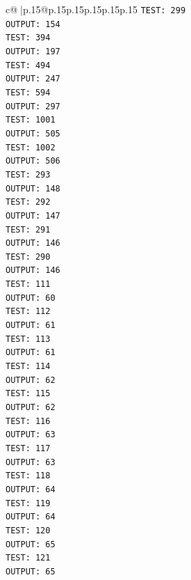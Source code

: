 \documentclass{article}
\begin{document}
{\begin{supertabular}{c@{$\;$}|p{.15\linewidth}@{}p{.15\linewidth}p{.15\linewidth}p{.15\linewidth}p{.15\linewidth}p{.15\linewidth}}
{{{\texttt{TEST: 299} \\
\texttt{OUTPUT: 154} \\
\texttt{TEST: 394} \\
\texttt{OUTPUT: 197} \\
\texttt{TEST: 494} \\
\texttt{OUTPUT: 247} \\
\texttt{TEST: 594} \\
\texttt{OUTPUT: 297} \\
\texttt{TEST: 1001} \\
\texttt{OUTPUT: 505} \\
\texttt{TEST: 1002} \\
\texttt{OUTPUT: 506} \\
\texttt{TEST: 293} \\
\texttt{OUTPUT: 148} \\
\texttt{TEST: 292} \\
\texttt{OUTPUT: 147} \\
\texttt{TEST: 291} \\
\texttt{OUTPUT: 146} \\
\texttt{TEST: 290} \\
\texttt{OUTPUT: 146} \\
\texttt{TEST: 111} \\
\texttt{OUTPUT: 60} \\
\texttt{TEST: 112} \\
\texttt{OUTPUT: 61} \\
\texttt{TEST: 113} \\
\texttt{OUTPUT: 61} \\
\texttt{TEST: 114} \\
\texttt{OUTPUT: 62} \\
\texttt{TEST: 115} \\
\texttt{OUTPUT: 62} \\
\texttt{TEST: 116} \\
\texttt{OUTPUT: 63} \\
\texttt{TEST: 117} \\
\texttt{OUTPUT: 63} \\
\texttt{TEST: 118} \\
\texttt{OUTPUT: 64} \\
\texttt{TEST: 119} \\
\texttt{OUTPUT: 64} \\
\texttt{TEST: 120} \\
\texttt{OUTPUT: 65} \\
\texttt{TEST: 121} \\
\texttt{OUTPUT: 65} \\
}}}
\end{supertabular}}
\end{document}
